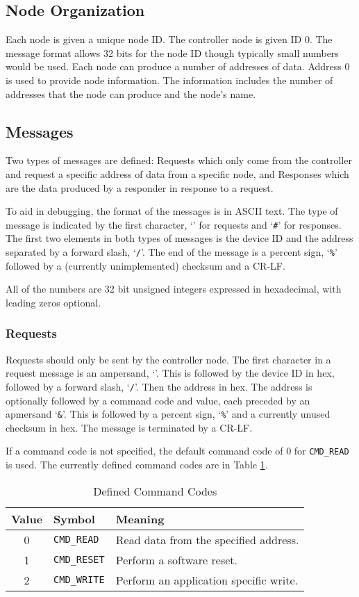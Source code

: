 \documentclass[10pt, openany, draft]{article}
\begin{document}
\subsection{Node Organization}
Each node is given a unique node ID.  The controller node is given ID 0.  The message format allows 32 bits for the node ID though typically small numbers would be used.  Each node can produce a number of addresses of data.  Address 0 is used to provide node information.  The information includes the number of addresses that the node can produce and the node's name.

\subsection{Messages}
Two types of messages are defined: Requests which only come from the controller and request a specific address of data from a specific node, and Responses which are the data produced by a responder in response to a request.

To aid in debugging, the format of the messages is in ASCII text.  The type of message is indicated by the first character, `\texttt{\@}' for requests and `\texttt{\#}' for responses.  The first two elements in both types of messages is the device ID and the address separated by a forward slash, `\texttt{/}'.  The end of the message is a percent sign, `\texttt{\%}' followed by a (currently unimplemented) checksum and a CR-LF.

All of the numbers are 32 bit unsigned integers expressed in hexadecimal, with leading zeros optional.  

\subsubsection{Requests}
Requests should only be sent by the controller node.  The first character in a request message is an ampersand, `\texttt{\@}'.  This is followed by the device ID in hex, followed by a forward slash, `\texttt{/}'.  Then the address in hex.  The address is optionally followed by a command code and value, each preceded by an apmersand `\texttt{\&}'.  This is followed by a percent sign, `\texttt{\%}' and a currently unused checksum in hex.  The message is terminated by a CR-LF.

If a command code is not specified, the default command code of 0 for \texttt{CMD\_READ} is used.  The currently defined command codes are in Table \ref{tab:commands}.

\begin{table}
  \centering
  \begin{tabular}{c l l}
    \hline
    Value & Symbol & Meaning \\
    \hline
    0 & \texttt{CMD\_READ} & Read data from the specified address.\\
    1 & \texttt{CMD\_RESET} & Perform a software reset.\\
    2 & \texttt{CMD\_WRITE} & Perform an application specific write.\\
  \end{tabular}
  \caption{Defined Command Codes}
  \label{tab:commands}
\end{table}
\end{document}
